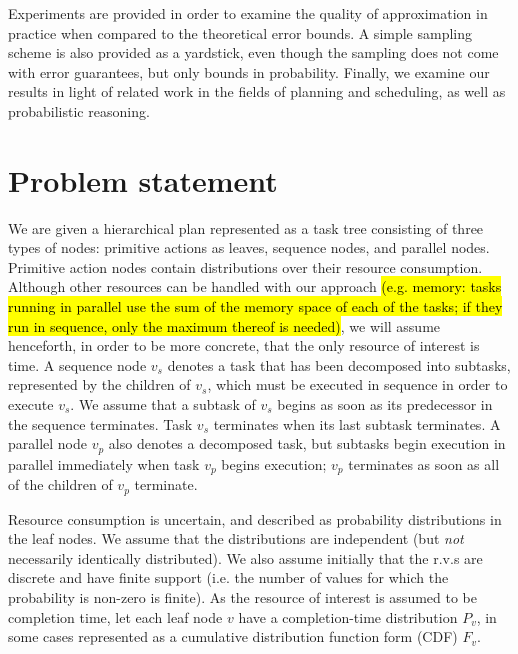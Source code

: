 \documentclass{article}
\begin{document}
Experiments are provided in order to examine the quality of approximation in practice when compared to the theoretical
error bounds. A simple sampling scheme is also provided as a yardstick, even though the sampling does not come with
error guarantees, but only bounds in probability. 
Finally, we examine our results in light of related work in the fields of planning and scheduling, as well as
probabilistic reasoning. %


\section{Problem statement}\label{sec:formal}

We are given a hierarchical plan represented as a task tree consisting of three types of nodes: primitive actions as leaves, sequence nodes, and parallel nodes.
Primitive action nodes contain distributions over their resource consumption. 
Although other resources can be handled with our approach \hl{(e.g. memory: tasks running in parallel use
the sum of the memory space of each of the tasks; if they run in sequence, only the maximum thereof is needed)}, we will assume henceforth,
in order to be more concrete, that the only resource of interest is time.
A sequence node $v_s$ denotes a task that has been decomposed
into subtasks, represented by the children of $v_s$, which must be executed in sequence 
in order to execute $v_s$.
We assume that a subtask of $v_s$ begins as soon as its predecessor in the sequence terminates.
Task $v_s$ terminates when its last subtask terminates.
A parallel node $v_p$ also denotes a decomposed task, but subtasks begin execution in parallel
immediately when task $v_p$ begins execution;  $v_p$ terminates
as soon as all of the children of $v_p$ terminate.

Resource consumption is uncertain, and described as probability distributions in the leaf nodes.
We assume  that the distributions are  independent (but {\em not} necessarily identically distributed).
We also assume initially that the r.v.s are discrete and have finite support (i.e. the number of values
for which the probability is non-zero is finite).
As the resource of interest is assumed to be completion time, let each leaf node $v$ have
a completion-time distribution $P_v$, in some cases represented as a cumulative 
distribution function form (CDF) $F_v$.
\end{document}
